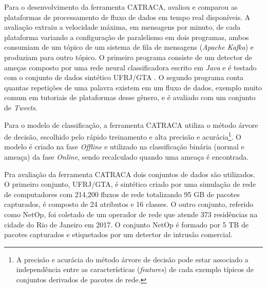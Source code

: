 
Para o desenvolvimento da ferramenta CATRACA,  avaliou e
comparou as plataformas de processamento de fluxo de dados em tempo real
disponíveis.
A avaliação extraiu a velocidade máxima, em mensagens por minuto,
de cada plataforma variando a configuração de paralelismo
em dois programas, ambos consumiam de um tópico de um sistema de fila
de mensagens (\emph{Apache Kafka}) e produziam para outro tópico.
O primeiro programa consiste de um detector de ameças composto por
uma rede neural classificadora escrito em \emph{Java} e é testado
com o conjunto de dados sintético UFRJ/GTA \cite{Lopez2018}.
O segundo programa conta quantas repetições de uma palavra existem em um
fluxo de dados, exemplo muito comum em tutoriais de plataformas desse gênero,
e é avaliado com um conjunto de \emph{Tweets}.


Para o modelo de classificação, a ferramenta CATRACA utiliza o método árvore de
decisão, escolhido pelo rápido treinamento e alta precisão e acurácia\footnote{
    A precisão e acurácia do método árvore de decisão pode estar associado
    a independência entre as características (\emph{features}) de cada exemplo
    típicos de conjuntos derivados de pacotes de rede.
}.
O modelo é criado na fase \emph{Offline} e utilizado na classificação binária
(normal e ameaça) da fase \emph{Online}, sendo recalculado quando uma ameaça
é encontrada.

Pra avaliação da ferramenta CATRACA dois conjuntos de dados são utilizados.
O primeiro conjunto, UFRJ/GTA, é sintético criado por uma simulação de rede de
computadores com 214,200 fluxos de rede totalizando 95 GB de pacotes capturados,
é composto de 24 atributos e 16 classes.
O outro conjunto, referido como NetOp, foi coletado de um operador de rede que
atende 373 residências na cidade do Rio de Janeiro em 2017.
O conjunto NetOp é formado por 5 TB de pacotes capturados e etiquetados por um
detector de intrusão comercial.

